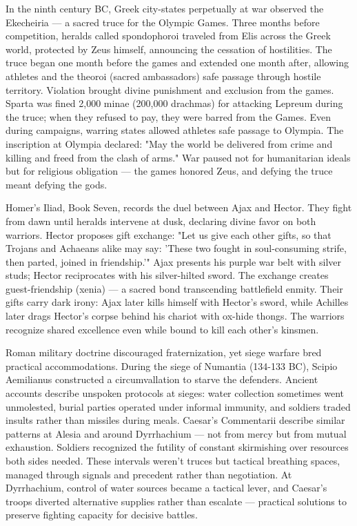 In the ninth century BC, Greek city-states perpetually at war observed the Ekecheiria — a sacred truce for the Olympic Games. Three months before competition, heralds called spondophoroi traveled from Elis across the Greek world, protected by Zeus himself, announcing the cessation of hostilities. The truce began one month before the games and extended one month after, allowing athletes and the theoroi (sacred ambassadors) safe passage through hostile territory. Violation brought divine punishment and exclusion from the games. Sparta was fined 2{,}000 minae (200{,}000 drachmas) for attacking Lepreum during the truce; when they refused to pay, they were barred from the Games. Even during campaigns, warring states allowed athletes safe passage to Olympia. The inscription at Olympia declared: "May the world be delivered from crime and killing and freed from the clash of arms." War paused not for humanitarian ideals but for religious obligation — the games honored Zeus, and defying the truce meant defying the gods.

Homer's Iliad, Book Seven, records the duel between Ajax and Hector. They fight from dawn until heralds intervene at dusk, declaring divine favor on both warriors. Hector proposes gift exchange: "Let us give each other gifts, so that Trojans and Achaeans alike may say: 'These two fought in soul-consuming strife, then parted, joined in friendship.'" Ajax presents his purple war belt with silver studs; Hector reciprocates with his silver-hilted sword. The exchange creates guest-friendship (xenia) — a sacred bond transcending battlefield enmity. Their gifts carry dark irony: Ajax later kills himself with Hector's sword, while Achilles later drags Hector's corpse behind his chariot with ox-hide thongs. The warriors recognize shared excellence even while bound to kill each other's kinsmen. 

Roman military doctrine discouraged fraternization, yet siege warfare bred practical accommodations. During the siege of Numantia (134-133 BC), Scipio Aemilianus constructed a circumvallation to starve the defenders. Ancient accounts describe unspoken protocols at sieges: water collection sometimes went unmolested, burial parties operated under informal immunity, and soldiers traded insults rather than missiles during meals. Caesar's Commentarii describe similar patterns at Alesia and around Dyrrhachium — not from mercy but from mutual exhaustion. Soldiers recognized the futility of constant skirmishing over resources both sides needed. These intervals weren't truces but tactical breathing spaces, managed through signals and precedent rather than negotiation. At Dyrrhachium, control of water sources became a tactical lever, and Caesar's troops diverted alternative supplies rather than escalate — practical solutions to preserve fighting capacity for decisive battles.

